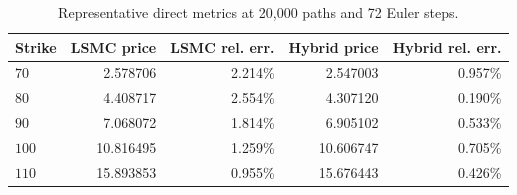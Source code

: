\begin{table}[htbp]
\centering
\caption{Representative direct metrics at 20,000 paths and 72 Euler steps.}
\label{tab:bgk_r02_calibrated_t1_nex12-step72-20k}
\begin{tabular}{lrrrr}
\toprule
Strike & LSMC price & LSMC rel. err. & Hybrid price & Hybrid rel. err. \\
\midrule
$70$ & 2.578706 & 2.214\% & 2.547003 & 0.957\% \\
$80$ & 4.408717 & 2.554\% & 4.307120 & 0.190\% \\
$90$ & 7.068072 & 1.814\% & 6.905102 & 0.533\% \\
$100$ & 10.816495 & 1.259\% & 10.606747 & 0.705\% \\
$110$ & 15.893853 & 0.955\% & 15.676443 & 0.426\% \\
\bottomrule
\end{tabular}
\end{table}
